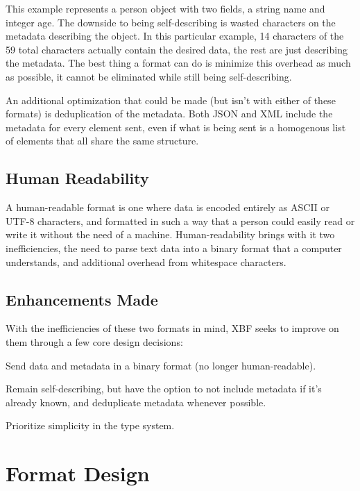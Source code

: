 \documentclass[conference]{IEEEtran}
\begin{document}
This example represents a person object with two fields, a string name and integer age. The downside to being self-describing is wasted characters on the metadata describing the object. In this particular example, 14 characters of the 59 total characters actually contain the desired data, the rest are just describing the metadata. The best thing a format can do is minimize this overhead as much as possible, it cannot be eliminated while still being self-describing.

An additional optimization that could be made (but isn't with either of these formats) is deduplication of the metadata. Both JSON and XML include the metadata for every element sent, even if what is being sent is a homogenous list of elements that all share the same structure.

\subsection{Human Readability}

A human-readable format is one where data is encoded entirely as ASCII or UTF-8 characters, and formatted in such a way that a person could easily read or write it without the need of a machine. Human-readability brings with it two inefficiencies, the need to parse text data into a binary format that a computer understands, and additional overhead from whitespace characters.

\subsection{Enhancements Made}

With the inefficiencies of these two formats in mind, XBF seeks to improve on them through a few core design decisions:

\begin{IEEEitemize}
	\item Send data and metadata in a binary format (no longer human-readable).
	\item Remain self-describing, but have the option to not include metadata if it's already known, and deduplicate metadata whenever possible.
	\item Prioritize simplicity in the type system.
\end{IEEEitemize}

\section{Format Design}
\end{document}
